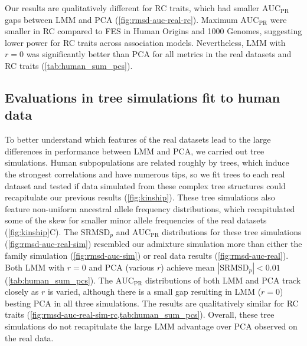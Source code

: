\documentclass[11pt]{article}
\newcommand{\rmsd}{\text{SRMSD}_p}
\newcommand{\auc}{\text{AUC}_\text{PR}}
\begin{document}
Our results are qualitatively different for RC traits, which had smaller $\auc$ gaps between LMM and PCA (\cref{fig:rmsd-auc-real-rc}).
Maximum $\auc$ were smaller in RC compared to FES in Human Origins and 1000 Genomes, suggesting lower power for RC traits across association models.
Nevertheless, LMM with $r=0$ was significantly better than PCA for all metrics in the real datasets and RC traits (\cref{tab:human_sum_pcs}).

\subsection{Evaluations in tree simulations fit to human data}

To better understand which features of the real datasets lead to the large differences in performance between LMM and PCA, we carried out tree simulations.
Human subpopulations are related roughly by trees, which induce the strongest correlations and have numerous tips, so we fit trees to each real dataset and tested if data simulated from these complex tree structures could recapitulate our previous results (\cref{fig:kinship}).
These tree simulations also feature non-uniform ancestral allele frequency distributions, which recapitulated some of the skew for smaller minor allele frequencies of the real datasets (\cref{fig:kinship}C).
The $\rmsd$ and $\auc$ distributions for these tree simulations (\cref{fig:rmsd-auc-real-sim}) resembled our admixture simulation more than either the family simulation (\cref{fig:rmsd-auc-sim}) or real data results (\cref{fig:rmsd-auc-real}).
Both LMM with $r=0$ and PCA (various $r$) achieve mean $|\rmsd| < 0.01$ (\cref{tab:human_sum_pcs}).
The $\auc$ distributions of both LMM and PCA track closely as $r$ is varied, although there is a small gap resulting in LMM ($r=0$) besting PCA in all three simulations.
The results are qualitatively similar for RC traits (\cref{fig:rmsd-auc-real-sim-rc,tab:human_sum_pcs}).
Overall, these tree simulations do not recapitulate the large LMM advantage over PCA observed on the real data.
\end{document}
